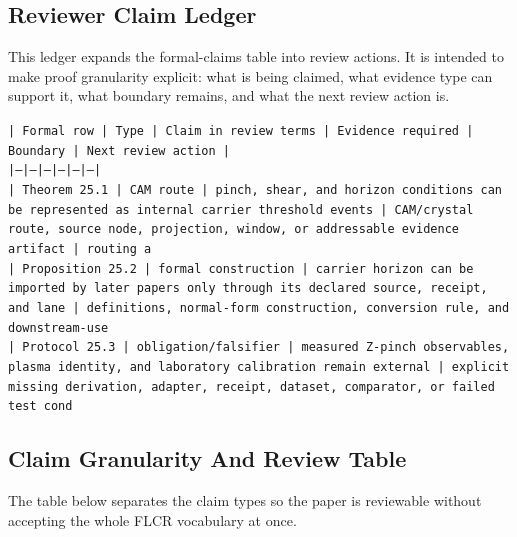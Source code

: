 \documentclass[11pt]{article}
\begin{document}
\subsection*{Reviewer Claim Ledger}

This ledger expands the formal-claims table into review actions. It is intended to make proof granularity explicit: what is being claimed, what evidence type can support it, what boundary remains, and what the next review action is.

\noindent\texttt{| Formal row | Type | Claim in review terms | Evidence required | Boundary | Next review action |}\\
\noindent\texttt{|---|---|---|---|---|---|}\\
\noindent\texttt{| Theorem 25.1 | CAM route | pinch, shear, and horizon conditions can be represented as internal carrier threshold events | CAM/crystal route, source node, projection, window, or addressable evidence artifact | routing a}\\
\noindent\texttt{| Proposition 25.2 | formal construction | carrier horizon can be imported by later papers only through its declared source, receipt, and lane | definitions, normal-form construction, conversion rule, and downstream-use }\\
\noindent\texttt{| Protocol 25.3 | obligation/falsifier | measured Z-pinch observables, plasma identity, and laboratory calibration remain external | explicit missing derivation, adapter, receipt, dataset, comparator, or failed test cond}\\

\subsection*{Claim Granularity And Review Table}

The table below separates the claim types so the paper is reviewable without accepting the whole FLCR vocabulary at once.
\end{document}
